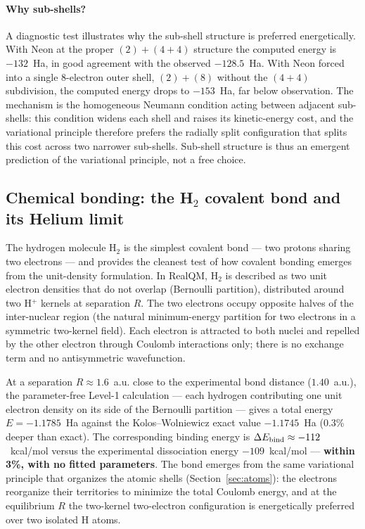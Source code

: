 \documentclass[11pt]{article}
\begin{document}
\paragraph{Why sub-shells?}
A diagnostic test illustrates why the sub-shell structure is preferred energetically. With Neon at the proper $(2) + (4{+}4)$ structure the computed energy is $-132$~Ha, in good agreement with the observed $-128.5$~Ha. With Neon forced into a single $8$-electron outer shell, $(2) + (8)$ without the $(4{+}4)$ subdivision, the computed energy drops to $-153$~Ha, far below observation. The mechanism is the homogeneous Neumann condition acting between adjacent sub-shells: this condition widens each shell and raises its kinetic-energy cost, and the variational principle therefore prefers the radially split configuration that splits this cost across two narrower sub-shells. Sub-shell structure is thus an emergent prediction of the variational principle, not a free choice.

\subsection{Chemical bonding: the H$_2$ covalent bond and its Helium limit}\label{sec:h2bond}

The hydrogen molecule H$_2$ is the simplest covalent bond --- two protons sharing two electrons --- and provides the cleanest test of how covalent bonding emerges from the unit-density formulation. In RealQM, H$_2$ is described as two unit electron densities that do not overlap (Bernoulli partition), distributed around two H$^+$ kernels at separation $R$. The two electrons occupy opposite halves of the inter-nuclear region (the natural minimum-energy partition for two electrons in a symmetric two-kernel field). Each electron is attracted to both nuclei and repelled by the other electron through Coulomb interactions only; there is no exchange term and no antisymmetric wavefunction.

At a separation $R \approx 1.6$~a.u. close to the experimental bond distance ($1.40$~a.u.), the parameter-free Level-1 calculation --- each hydrogen contributing one unit electron density on its side of the Bernoulli partition --- gives a total energy $E = -1.1785$~Ha against the Kolos--Wolniewicz exact value $-1.1745$~Ha (0.3\% deeper than exact). The corresponding binding energy is $\Delta E_{\rm bind} \approx -112$~kcal/mol versus the experimental dissociation energy $-109$~kcal/mol --- \textbf{within 3\%, with no fitted parameters}. The bond emerges from the same variational principle that organizes the atomic shells (Section~\ref{sec:atoms}): the electrons reorganize their territories to minimize the total Coulomb energy, and at the equilibrium $R$ the two-kernel two-electron configuration is energetically preferred over two isolated H atoms.
\end{document}
